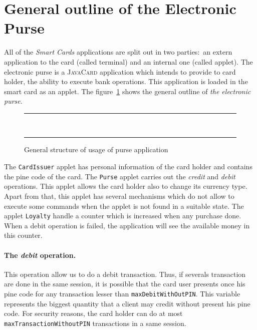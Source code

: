 \documentclass[a4paper]{llncs}
\begin{document}
\section{General outline of the Electronic Purse}
\label{SectGenPurse}
All of the \textit{Smart Cards} applications are split out in two
parties$:$ an extern application to the card (called terminal) and an
internal one (called applet). The electronic purse is a
\textsc{JavaCard} application which intends to provide to card holder,
the ability to execute bank operations. This application is loaded in
the smart card as an applet. The figure~\ref{fig-cas-pur} shows the
general outline of \textit{the electronic purse}.




\begin{center}
\begin{figure}[hbt]
\rule{\linewidth}{0.3mm}
\\[2.5ex]
\centering
\mbox{\epsfxsize=5cm}
\caption{General structure of usage of purse application}
\label{fig-cas-pur}
\rule{\linewidth}{0.3mm}
\end{figure}
\end{center}




The  \texttt{CardIssuer} applet has personal information of the card
holder and contains the pine code of the card. The \texttt{Purse}
applet carries out the \textit{credit} and \textit{debit}
operations. This applet allows the card holder also to change its
currency type. Apart from that, this applet has several mechanisms
which do not allow to execute some commands when the applet is not
found in a suitable state. The applet \texttt{Loyalty} handle a
counter which is increased when any purchase done. When
a debit operation is failed, the application will see the available
money in this counter.


\paragraph{The \textit{debit} operation.}
This operation allow us to do a debit transaction. Thus, if
severals transaction are done in the same session, it is possible that 
the card user presents once his pine code for any transaction lesser than
\texttt{maxDebitWithOutPIN}. This variable represents the biggest
quantity that a client may credit without present his pine code. For
security reasons, the card holder can do at most
\texttt{maxTransactionWithoutPIN} transactions in a same session. 
\end{document}
